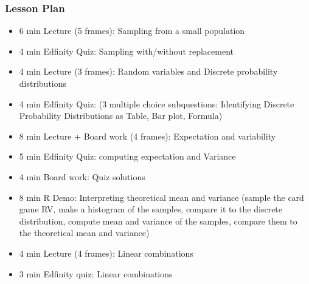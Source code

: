 \begin{frame}
    \frametitle{Lesson Plan}
    \begin{itemize}
        \item 6 min Lecture (5 frames): Sampling from a small population
        \item 4 min Edfinity Quiz: Sampling with/without replacement
        \item 4 min Lecture (3 frames): Random variables and Discrete probability distributions
        \item 4 min Edfinity Quiz: (3 multiple choice subquestions: Identifying Discrete Probability Distributions as Table, Bar plot, Formula)
        \item 8 min Lecture + Board work (4 frames): Expectation and variability
        \item 5 min Edfinity Quiz: computing expectation and Variance
        \item 4 min Board work: Quiz solutions
        \item 8 min R Demo: Interpreting theoretical mean and variance (sample the card game RV, make a histogram of the samples, compare it to the discrete distribution, compute mean and variance of the samples, compare them to the theoretical mean and variance)
        \item 4 min Lecture (4 frames): Linear combinations
        \item 3 min Edfinity quiz: Linear combinations
   \end{itemize}
\end{frame}


